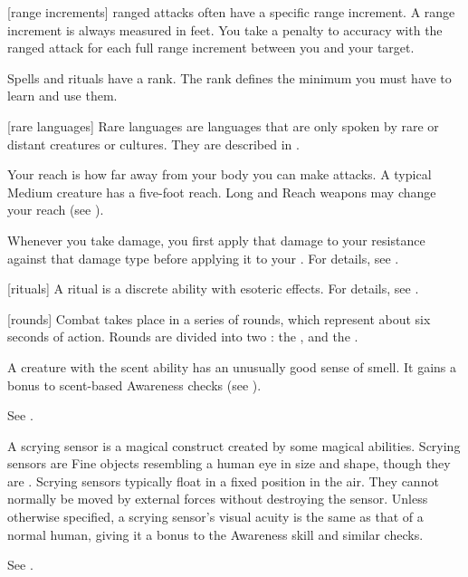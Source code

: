 [range increments]  ranged attacks often have a specific range increment.
A range increment is always measured in feet.
You take a  penalty to accuracy with the ranged attack for each full range increment between you and your target.

 Spells and rituals have a rank.
The rank defines the minimum  you must have to learn and use them.

[rare languages] Rare languages are languages that are only spoken by rare or distant creatures or cultures.
They are described in .

 Your reach is how far away from your body you can make  attacks.
A typical Medium creature has a five-foot reach.
Long and Reach weapons may change your reach (see ).

 Whenever you take damage, you first apply that damage to your resistance against that damage type before applying it to your .
For details, see .

[rituals] A ritual is a discrete  ability with esoteric effects.
For details, see .

[rounds] Combat takes place in a series of rounds, which represent about six seconds of action.
Rounds are divided into two : the , and the .

 A creature with the scent ability has an unusually good sense of smell.
It gains a  bonus to scent-based Awareness checks (see ).

 See .

 A scrying sensor is a magical construct created by some magical abilities.
Scrying sensors are Fine objects resembling a human eye in size and shape, though they are .
Scrying sensors typically float in a fixed position in the air.
They cannot normally be moved by external forces without destroying the sensor.
Unless otherwise specified, a scrying sensor's visual acuity is the same as that of a normal human, giving it a  bonus to the Awareness skill and similar checks.

 See .

